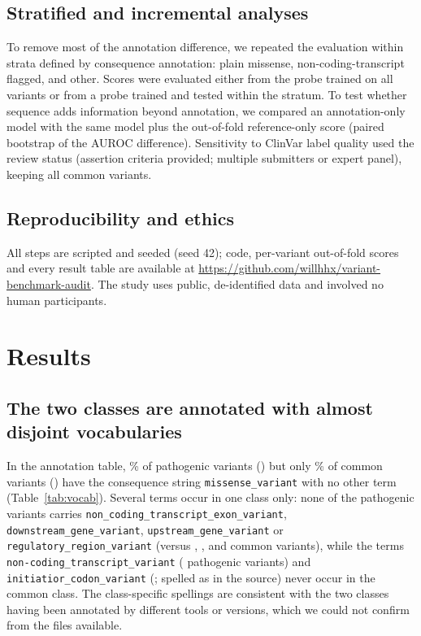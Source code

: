 \documentclass[11pt]{article}
\begin{document}
\subsection{Stratified and incremental analyses}
To remove most of the annotation difference, we repeated the evaluation within strata defined by consequence annotation: plain missense, non-coding-transcript flagged, and other. Scores were evaluated either from the probe trained on all variants or from a probe trained and tested within the stratum. To test whether sequence adds information beyond annotation, we compared an annotation-only model with the same model plus the out-of-fold reference-only score (paired bootstrap of the AUROC difference). Sensitivity to ClinVar label quality used the review status (assertion criteria provided; multiple submitters or expert panel), keeping all common variants.

\subsection{Reproducibility and ethics}
All steps are scripted and seeded (seed 42); code, per-variant out-of-fold scores and every result table are available at \url{https://github.com/willhhx/variant-benchmark-audit}. The study uses public, de-identified data and involved no human participants.

\section{Results}
\subsection{The two classes are annotated with almost disjoint vocabularies}
In the annotation table, \PurePctPath\% of pathogenic variants (\PureNPath) but only \PurePctCommon\% of common variants (\PureNCommon) have the consequence string \texttt{missense\_variant} with no other term (Table~\ref{tab:vocab}). Several terms occur in one class only: none of the pathogenic variants carries \texttt{non\_coding\_transcript\_exon\_variant}, \texttt{downstream\_gene\_variant}, \texttt{upstream\_gene\_variant} or \texttt{regulatory\_region\_variant} (versus \NCExonCom, \DownstreamCom, \UpstreamCom{} and \RegulatoryCom{} common variants), while the terms \texttt{non-coding\_transcript\_variant} (\NCHyphenPath{} pathogenic variants) and \texttt{initiatior\_codon\_variant} (\InitTypoPath; spelled as in the source) never occur in the common class. The class-specific spellings are consistent with the two classes having been annotated by different tools or versions, which we could not confirm from the files available.
\end{document}
